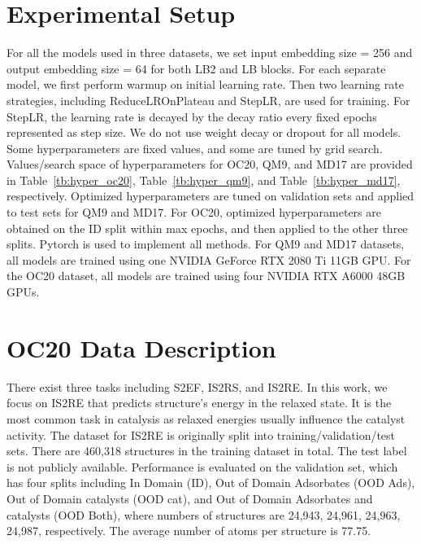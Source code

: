 \documentclass{article}
\begin{document}
\section{Experimental Setup} \label{sec:supp_D}
For all the models used in three datasets,
we set input embedding size = 256
and output embedding size = 64 for both LB2 and LB blocks.
For each separate model, we first perform warmup on initial learning rate.
Then two learning rate strategies, including ReduceLROnPlateau and StepLR, are used for training. For StepLR, the learning rate is decayed by the decay ratio every fixed epochs represented as step size.
We do not use weight decay or dropout for all models.
Some hyperparameters are fixed values, and 
some are tuned by grid search.
Values/search space of hyperparameters for OC20, QM9, and MD17 are provided in
Table~\ref{tb:hyper_oc20}, Table~\ref{tb:hyper_qm9},
and Table~\ref{tb:hyper_md17}, respectively.
Optimized hyperparameters are tuned on validation sets
and applied to test sets for QM9 and MD17.
For OC20, optimized hyperparameters are obtained on the ID split within max epochs, and then applied to the other three splits.
Pytorch is used to implement all methods.
For QM9 and MD17 datasets, all models are trained using
one NVIDIA GeForce RTX 2080 Ti 11GB GPU.
For the OC20 dataset, all models are trained using
four NVIDIA RTX A6000 48GB GPUs.

\section{OC20 Data Description} \label{sec:oc20_intro}
There exist three tasks including
S2EF, IS2RS,
and IS2RE.
In this work, we focus on IS2RE that
predicts structure's energy in the relaxed state.
It is the most common task in catalysis as relaxed
energies usually influence the catalyst activity.
The dataset for IS2RE is originally split into 
training/validation/test sets.
There are 460,318 structures in the training dataset in total.
The test label is not publicly available.
Performance is evaluated on the validation set,
which has four splits
including In Domain (ID), Out of Domain Adsorbates (OOD Ads),
Out of Domain catalysts (OOD cat), and Out of Domain Adsorbates and catalysts (OOD Both), where numbers of structures are 24,943,
24,961, 24,963, 24,987, respectively.
The average number of atoms per structure is 77.75.
\end{document}
